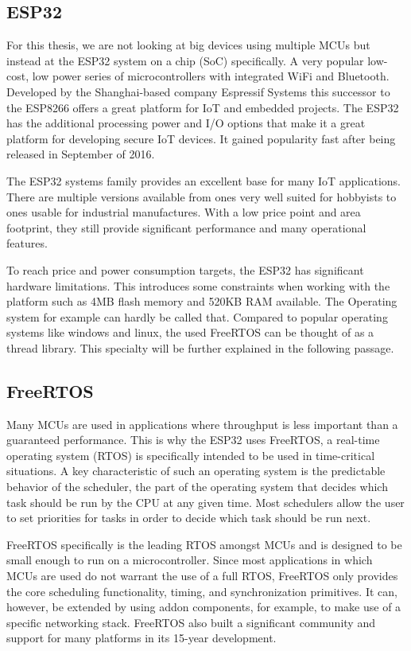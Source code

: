 \subsection{ESP32}
For this thesis, we are not looking at big devices using multiple MCUs but instead at the ESP32 system on a chip (SoC) specifically. A very popular low-cost, low power series of microcontrollers with integrated WiFi and Bluetooth. Developed by the Shanghai-based company Espressif Systems this successor to the ESP8266 offers a great platform for IoT and embedded projects\autocite{noauthor_esp32_nodate}. The ESP32 has the additional processing power and I/O options that make it a great platform for developing secure IoT devices. It gained popularity fast after being released in September of 2016.

The ESP32 systems family provides an excellent base for many IoT applications. There are multiple versions available from ones very well suited for hobbyists to ones usable for industrial manufactures. With a low price point and area footprint, they still provide significant performance and many operational features\autocite{maier_comparative_2017}.

To reach price and power consumption targets, the ESP32 has significant hardware limitations. This introduces some constraints when working with the platform such as 4MB flash memory and 520KB RAM available. The Operating system for example can hardly be called that. Compared to popular operating systems like windows and linux, the used FreeRTOS can be thought of as a thread library. This specialty will be further explained in the following passage.

\subsection{FreeRTOS}\label{subsec:freertos}

Many MCUs are used in applications where throughput is less important than a guaranteed performance. This is why the ESP32 uses FreeRTOS, a real-time operating system (RTOS) is specifically intended to be used in time-critical situations. A key characteristic of such an operating system is the predictable behavior of the scheduler, the part of the operating system that decides which task should be run by the CPU at any given time. Most schedulers allow the user to set priorities for tasks in order to decide which task should be run next.

FreeRTOS specifically is the leading RTOS amongst MCUs and is designed to be small enough to run on a microcontroller\autocite{noauthor_freertos_nodate}. Since most applications in which MCUs are used do not warrant the use of a full RTOS, FreeRTOS only provides the core scheduling functionality, timing, and synchronization primitives. It can, however, be extended by using addon components, for example, to make use of a specific networking stack. FreeRTOS also built a significant community and support for many platforms in its 15-year development.

